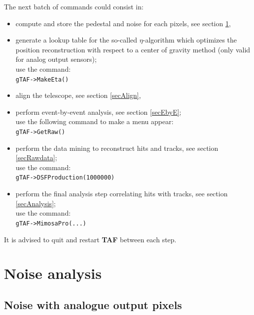 \documentclass[a4paper, 12pt, twoside]{article}
\newif\ifwithcomment
\newcommand{\comment}[1]{\ifwithcomment {\textcolor{blue}{\it#1}} \fi}
\newcommand{\TAF}{{\bf TAF }}
\begin{document}
\noindent
The next batch of commands could consist in:
\begin{itemize}
\item compute and store the pedestal and noise for each pixels, see section \ref{secNoise},
\item generate a lookup table for the so-called $\eta$-algorithm which optimizes the position reconstruction with respect to a center of gravity method (only valid for analog output sensors);\\ use the command:\\
{\tt gTAF->MakeEta()}
\item align the telescope, see section \ref{secAlign},
\item perform event-by-event analysis, see section \ref{secEbyE};\\ use the following command to make a menu appear:\\
{\tt gTAF->GetRaw()}
\item perform the data mining to reconstruct hits and tracks, see section \ref{secRawdata};\\ use the command:\\
{\tt gTAF->DSFProduction(1000000)}
\item perform the final analysis step correlating hits with tracks, see section \ref{secAnalysis};\\ use the command:\\
{\tt gTAF->MimosaPro(...)}
\end{itemize}

\noindent
It is advised to quit and restart \TAF between each step.


\vspace{2cm}

\section{Noise analysis}
\label{secNoise}

\comment{This section needs complete reshuffling since additional ways to take into account hot pixels was included by Alejandro.}

\subsection{Noise with analogue output pixels}
\label{subsec:analogueNoise}
\end{document}
